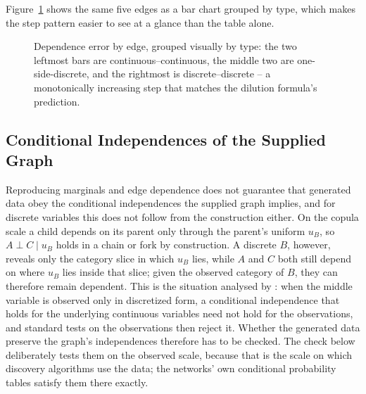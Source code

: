 \documentclass[
  english,
  class=report,
  accentcolor=2c,
  marginpar=false,
  parskip=half-,
  fontsize=11pt,
  ruledheaders=false,
  pdfa=false,
  IMRAD=false,
  thesis={type=master}
]{tudapub}
\begin{document}
Figure~\ref{fig:mixed-edges} shows the same five edges as a bar chart
grouped by type, which makes the step pattern easier to see at a glance
than the table alone.

\begin{figure}[ht]
\centering
{}
\caption{Dependence error by edge, grouped visually by type: the two leftmost bars are continuous--continuous, the middle two are one-side-discrete, and the rightmost is discrete--discrete -- a monotonically increasing step that matches the dilution formula's prediction.}
\label{fig:mixed-edges}
\end{figure}


\subsection{Conditional Independences of the Supplied Graph}
\label{sec:rq4-ci}
Reproducing marginals and edge dependence does not guarantee that generated
data obey the conditional independences the supplied graph implies, and for
discrete variables this does not follow from the construction either. On
the copula scale a child depends on its parent only through the parent's
uniform $u_B$, so $A \perp C \mid u_B$ holds in a chain or fork by
construction. A discrete $B$, however, reveals only the category slice in
which $u_B$ lies, while $A$ and $C$ both still depend on where $u_B$ lies
inside that slice; given the observed category of $B$, they can therefore
remain dependent. This is the situation analysed by \textcite{sun2024}: when
the middle variable is observed only in discretized form, a conditional
independence that holds for the underlying continuous variables need not
hold for the observations, and standard tests on the observations then
reject it. Whether the generated data preserve the graph's independences
therefore has to be checked. The check below deliberately tests them on the
observed scale, because that is the scale on which discovery algorithms
use the data; the networks' own conditional probability tables satisfy
them there exactly.
\end{document}
